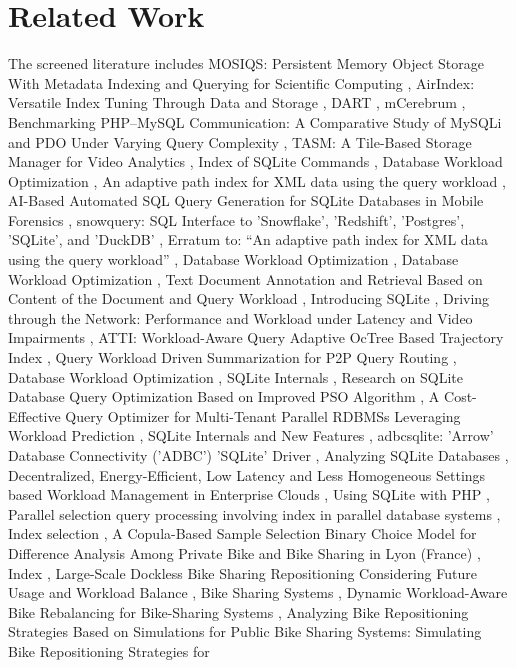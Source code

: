 \documentclass{article}
\begin{document}
\section{Related Work}
The screened literature includes MOSIQS: Persistent Memory Object Storage With Metadata Indexing and Querying for Scientific Computing \cite{khan2021mosiqs}, AirIndex: Versatile Index Tuning Through Data and Storage \cite{chockchowwat2023airindex}, DART \cite{zhang2018dart}, mCerebrum \cite{hossain2017mcerebrum}, Benchmarking PHP–MySQL Communication: A Comparative Study of MySQLi and PDO Under Varying Query Complexity \cite{andrijevi2025benchmarking}, TASM: A Tile-Based Storage Manager for Video Analytics \cite{daum2021tasm}, Index of SQLite Commands \cite{paper2019index}, Database Workload Optimization \cite{fritchey2018database}, An adaptive path index for XML data using the query workload \cite{min2005adaptive}, AI-Based Automated SQL Query Generation for SQLite Databases in Mobile Forensics \cite{pawlaszczyk2026aibased}, snowquery: SQL Interface to 'Snowflake', 'Redshift', 'Postgres', 'SQLite', and 'DuckDB' \cite{mermelstein2023snowquery}, Erratum to: “An adaptive path index for XML data using the query workload” \cite{min2006erratum}, Database Workload Optimization \cite{paper2009database}, Database Workload Optimization \cite{fritchey2014database}, Text Document Annotation and Retrieval Based on Content of the Document and Query Workload \cite{paper2016text}, Introducing SQLite \cite{paperndintroducing}, Driving through the Network: Performance and Workload under Latency and Video Impairments \cite{trautmannsheimer2026driving}, ATTI: Workload-Aware Query Adaptive OcTree Based Trajectory Index \cite{meng2013atti}, Query Workload Driven Summarization for P2P Query Routing \cite{nguyen2008query}, Database Workload Optimization \cite{fritchey2012database}, SQLite Internals \cite{paperndsqlite}, Research on SQLite Database Query Optimization Based on Improved PSO Algorithm \cite{zhao2016research}, A Cost-Effective Query Optimizer for Multi-Tenant Parallel RDBMSs Leveraging Workload Prediction \cite{danaouindcosteffective}, SQLite Internals and New Features \cite{allen2010sqlite}, adbcsqlite: 'Arrow' Database Connectivity ('ADBC') 'SQLite' Driver \cite{dunnington2023adbcsqlite}, Analyzing SQLite Databases \cite{languedoc2016analyzing}, Decentralized, Energy-Efficient, Low Latency and Less Homogeneous Settings based Workload Management in Enterprise Clouds \cite{bhuvaneshwari2016decentralized}, Using SQLite with PHP \cite{feiler2015using}, Parallel selection query processing involving index in parallel database systems \cite{rahayundparallel}, Index selection \cite{sun2013index}, A Copula-Based Sample Selection Binary Choice Model for Difference Analysis Among Private Bike and Bike Sharing in Lyon (France) \cite{havet2024copulabased}, Index \cite{paper2015index}, Large-Scale Dockless Bike Sharing Repositioning Considering Future Usage and Workload Balance \cite{hua2022largescale}, Bike Sharing Systems \cite{paper2012bike}, Dynamic Workload-Aware Bike Rebalancing for Bike-Sharing Systems \cite{luo2023dynamic}, Analyzing Bike Repositioning Strategies Based on Simulations for Public Bike Sharing Systems: Simulating Bike Repositioning Strategies for 
\end{document}

